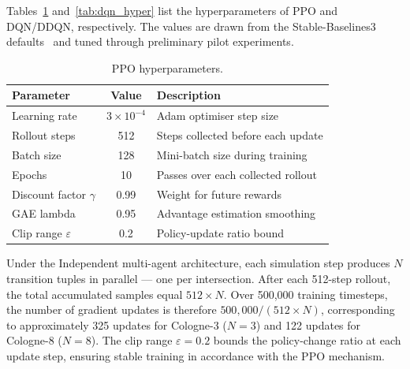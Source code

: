 Tables~\ref{tab:ppo_hyper} and~\ref{tab:dqn_hyper} list the hyperparameters of
PPO and DQN/DDQN, respectively. The values are drawn from the Stable-Baselines3
defaults~\cite{stable_baselines3} and tuned through preliminary pilot experiments.

\begin{table}[htbp]
    \caption{PPO hyperparameters.}
    \label{tab:ppo_hyper}
    \centering
    \begin{tabular}{lcp{6cm}}
        \toprule
        \textbf{Parameter} & \textbf{Value} & \textbf{Description} \\
        \midrule
        Learning rate      & $3\times10^{-4}$ & Adam optimiser step size \\
        Rollout steps      & 512  & Steps collected before each update \\
        Batch size         & 128  & Mini-batch size during training \\
        Epochs             & 10   & Passes over each collected rollout \\
        Discount factor $\gamma$ & 0.99 & Weight for future rewards \\
        GAE lambda         & 0.95 & Advantage estimation smoothing \\
        Clip range $\varepsilon$ & 0.2 & Policy-update ratio bound \\
        \bottomrule
    \end{tabular}
\end{table}

Under the Independent multi-agent architecture, each simulation step produces
$N$ transition tuples in parallel — one per intersection. After each 512-step
rollout, the total accumulated samples equal $512\times N$. Over 500{,}000
training timesteps, the number of gradient updates is therefore
$500{,}000 / (512 \times N)$, corresponding to approximately 325 updates for
Cologne-3 ($N = 3$) and 122 updates for Cologne-8 ($N = 8$). The clip
range $\varepsilon = 0.2$ bounds the policy-change ratio at each update step,
ensuring stable training in accordance with the PPO mechanism.

